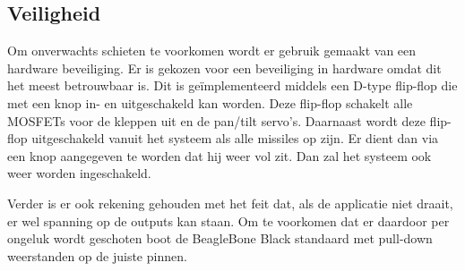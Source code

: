 \subsection{Veiligheid}

Om onverwachts schieten te voorkomen wordt er gebruik gemaakt van een hardware beveiliging.
Er is gekozen voor een beveiliging in hardware omdat dit het meest betrouwbaar is. Dit is
geïmplementeerd middels een D-type flip-flop die met een knop in- en uitgeschakeld kan
worden. Deze flip-flop schakelt alle MOSFETs voor de kleppen uit en de pan/tilt servo's.
Daarnaast wordt deze flip-flop uitgeschakeld vanuit het systeem als alle missiles op zijn.
Er dient dan via een knop aangegeven te worden dat hij weer vol zit. Dan zal het systeem
ook weer worden ingeschakeld.

Verder is er ook rekening gehouden met het feit dat, als de applicatie niet draait, er wel
spanning op de outputs kan staan. Om te voorkomen dat er daardoor per ongeluk wordt geschoten
boot de BeagleBone Black standaard met pull-down weerstanden op de juiste pinnen.
